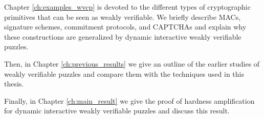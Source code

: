 Chapter \ref{ch:examples_wvcp} is devoted to the different types of cryptographic primitives that
can be seen as weakly verifiable.
We briefly describe MACs, signature schemes, commitment protocols, and CAPTCHAs and explain why
these constructions are generalized by dynamic interactive weakly verifiable puzzles.

Then, in Chapter \ref{ch:previous_results} we give an outline of the earlier studies of weakly
verifiable puzzles and compare them with the techniques used in this thesis.

Finally, in Chapter \ref{ch:main_result} we give the proof of hardness amplification
for dynamic interactive weakly verifiable puzzles and discuss this result.

